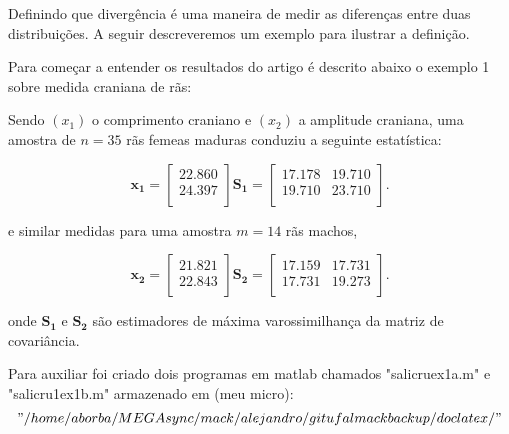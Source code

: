 Definindo que divergência é uma maneira de medir as diferenças entre duas distribuições. A seguir descreveremos um exemplo para ilustrar a definição.

Para começar a entender os resultados do artigo \cite{smp} é descrito abaixo o exemplo 1 sobre medida craniana de rãs:

Sendo $(x_1)$ o comprimento craniano e $(x_2)$ a amplitude craniana, uma amostra de $n=35$ rãs femeas maduras conduziu a seguinte estatística:

$$
\mathbf{x_1} = \left[
\begin{array}{c}
	22.860   \\
	24.397   \\
\end{array}
\right]
\mathbf{S_1} = \left[
\begin{array}{cc}
	 17.178  & 19.710   \\
         19.710  & 23.710   \\
\end{array}
\right].
$$

e similar medidas para uma amostra $m=14$ rãs machos, 

$$
\mathbf{x_2} = \left[
\begin{array}{c}
	21.821  \\
	22.843   \\
\end{array}
\right]
\mathbf{S_2} = \left[
\begin{array}{cc}
	 17.159  & 17.731   \\
         17.731  & 19.273   \\
\end{array}
\right].
$$

onde $\mathbf{S_1}$ e $\mathbf{S_2}$ são estimadores de máxima varossimilhança da matriz de covariância.

Para auxiliar foi criado dois programas em matlab chamados "salicruex1a.m" e "salicru1ex1b.m" armazenado em (meu micro): $$"/home/aborba/MEGAsync/mack/alejandro/gitufalmackbackup/doclatex/"$$


